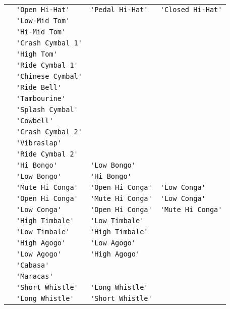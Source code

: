 \documentclass{article}
\newcommand\lvlo{}
\begin{document}
\begin{center}
\begin{longtable}{llll}
 \lvlo & \lstinline!'Open Hi-Hat'! & \lstinline!'Pedal Hi-Hat'! & \lstinline!'Closed Hi-Hat'! \\
 \lvlo & \lstinline!'Low-Mid Tom'! & & \\
 \lvlo & \lstinline!'Hi-Mid Tom'! & & \\
 \lvlo & \lstinline!'Crash Cymbal 1'! & & \\
 \lvlo & \lstinline!'High Tom'! & & \\
 \lvlo & \lstinline!'Ride Cymbal 1'! & & \\
 \lvlo & \lstinline!'Chinese Cymbal'! & & \\
 \lvlo & \lstinline!'Ride Bell'! & & \\
 \lvlo & \lstinline!'Tambourine'! & & \\
 \lvlo & \lstinline!'Splash Cymbal'! & & \\
 \lvlo & \lstinline!'Cowbell'! & & \\
 \lvlo & \lstinline!'Crash Cymbal 2'! & & \\
 \lvlo & \lstinline!'Vibraslap'! & & \\
 \lvlo & \lstinline!'Ride Cymbal 2'! & & \\
 \lvlo & \lstinline!'Hi Bongo'! & \lstinline!'Low Bongo'! & \\
 \lvlo & \lstinline!'Low Bongo'! & \lstinline!'Hi Bongo'! & \\
 \lvlo & \lstinline!'Mute Hi Conga'! & \lstinline!'Open Hi Conga'! & \lstinline!'Low Conga'! \\
 \lvlo & \lstinline!'Open Hi Conga'! & \lstinline!'Mute Hi Conga'! & \lstinline!'Low Conga'! \\
 \lvlo & \lstinline!'Low Conga'! & \lstinline!'Open Hi Conga'! & \lstinline!'Mute Hi Conga'! \\
 \lvlo & \lstinline!'High Timbale'! & \lstinline!'Low Timbale'! & \\
 \lvlo & \lstinline!'Low Timbale'! & \lstinline!'High Timbale'! & \\
 \lvlo & \lstinline!'High Agogo'! & \lstinline!'Low Agogo'! & \\
 \lvlo & \lstinline!'Low Agogo'! & \lstinline!'High Agogo'! & \\
 \lvlo & \lstinline!'Cabasa'! & & \\
 \lvlo & \lstinline!'Maracas'! & & \\
 \lvlo & \lstinline!'Short Whistle'! & \lstinline!'Long Whistle'! & \\
 \lvlo & \lstinline!'Long Whistle'! & \lstinline!'Short Whistle'! & \\

\end{longtable}
\end{center}
\end{document}
